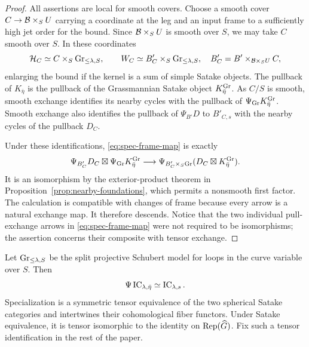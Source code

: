 \begin{proof}
All assertions are local for smooth covers.  Choose a smooth cover
$C\to\mathcal B\times_S U$ carrying a coordinate at the leg and an input
frame to a sufficiently high jet order for the bound.  Since
$\mathcal B\times_S U$ is smooth over $S$, we may take $C$ smooth over $S$.
In these coordinates
\[
   \mathcal H_C\simeq C\times_S\operatorname{Gr}_{\leq\lambda,S},\qquad
   W_C\simeq B'_C\times_S\operatorname{Gr}_{\leq\lambda,S},
 \quad B'_C=B'\mathbin{\times}_{\mathcal B\times_S U}C,
\]
enlarging the bound if the kernel is a sum of simple Satake objects.
The pullback of $K_{\bar\eta}$ is the pullback of the Grassmannian
Satake object $K^{\operatorname{Gr}}_{\bar\eta}$.  As $C/S$ is smooth, smooth
exchange identifies its nearby cycles with the pullback of
$\Psi_{\operatorname{Gr}}K^{\operatorname{Gr}}_{\bar\eta}$.  Smooth exchange also identifies
the pullback of $\Psi_{B'}D$ to $B'_{C,s}$ with the nearby cycles of
the pullback $D_C$.

Under these identifications, \eqref{eq:spec-frame-map} is exactly
\[
 \Psi_{B'_C}D_C\boxtimes\Psi_{\operatorname{Gr}}K^{\operatorname{Gr}}_{\bar\eta}
     \longrightarrow
 \Psi_{B'_C\times_S\operatorname{Gr}}
                       (D_C\boxtimes K^{\operatorname{Gr}}_{\bar\eta}).
\]
It is an isomorphism by the exterior-product theorem in
Proposition~\ref{prop:nearby-foundations}, which permits a nonsmooth
first factor.  The calculation is compatible with changes of frame
because every arrow is a natural exchange map.  It therefore descends.
Notice that the two individual pull-exchange arrows in
\eqref{eq:spec-frame-map} were not required to be isomorphisms; the
assertion concerns their composite with tensor exchange.
\end{proof}

\begin{lemma}\label{lem:spec-satake}
Let $\operatorname{Gr}_{\leq\lambda,S}$ be the split projective Schubert model for
loops in the curve variable over $S$.  Then
\begin{equation}\label{eq:spec-simple-satake}
                 \Psi\operatorname{IC}_{\lambda,\bar\eta}
                                  \simeq\operatorname{IC}_{\lambda,s}.
\end{equation}
Specialization is a symmetric tensor equivalence of the two spherical
Satake categories and intertwines their cohomological fiber functors.
Under Satake equivalence, it is tensor isomorphic to the identity on
$\operatorname{Rep}(\widehat G)$.  Fix such a tensor identification in the rest of the paper.
\end{lemma}

